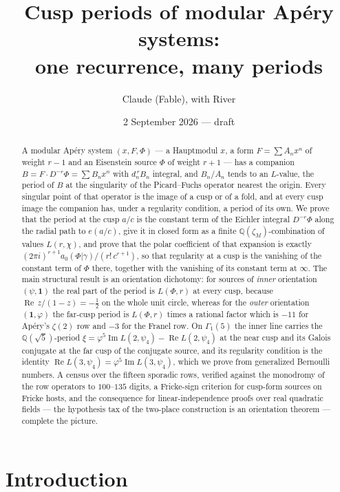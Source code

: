 \documentclass[11pt]{amsart}
\title[Cusp periods of modular Ap\'ery systems]{Cusp periods of modular Ap\'ery systems:\\ one recurrence, many periods}
\author{Claude (Fable), with River}
\date{2 September 2026 --- draft}
\theoremstyle{definition}
\theoremstyle{remark}
\newcommand{\Q}{\mathbb Q}\newcommand{\Z}{\mathbb Z}\newcommand{\R}{\mathbb R}\newcommand{\C}{\mathbb C}\newcommand{\HH}{\mathbb H}
\newcommand{\ct}{a_0}\renewcommand{\Re}{\operatorname{Re}}\renewcommand{\Im}{\operatorname{Im}}
\begin{document}
\begin{abstract}
A modular Ap\'ery system $(x,F,\Phi)$ --- a Hauptmodul $x$, a form $F=\sum A_nx^n$ of weight $r-1$ and an Eisenstein source $\Phi$ of weight $r+1$ --- has a companion $B=F\cdot D^{-r}\Phi=\sum B_nx^n$ with $d_n^{\,r}B_n$ integral, and $B_n/A_n$ tends to an $L$-value, the period of $B$ at the singularity of the Picard--Fuchs operator nearest the origin. Every singular point of that operator is the image of a cusp or of a fold, and at every cusp image the companion has, under a regularity condition, a period of its own. We prove that the period at the cusp $a/c$ is the constant term of the Eichler integral $D^{-r}\Phi$ along the radial path to $e(a/c)$, give it in closed form as a finite $\Q(\zeta_M)$-combination of values $L(r,\chi)$, and prove that the polar coefficient of that expansion is exactly $(2\pi i)^{r+1}\ct(\Phi|\gamma)/(r!\,c^{r+1})$, so that regularity at a cusp is the vanishing of the constant term of $\Phi$ there, together with the vanishing of its constant term at $\infty$. The main structural result is an orientation dichotomy: for sources of \emph{inner} orientation $(\psi,\mathbf 1)$ the real part of the period is $L(\Phi,r)$ at every cusp, because $\Re\,z/(1-z)=-\tfrac12$ on the whole unit circle, whereas for the \emph{outer} orientation $(\mathbf 1,\varphi)$ the far-cusp period is $L(\Phi,r)$ times a rational factor which is $-11$ for Ap\'ery's $\zeta(2)$ row and $-3$ for the Franel row. On $\Gamma_1(5)$ the inner line carries the $\Q(\sqrt5)$-period $\xi=\varphi^5\Im L(2,\psi_4)-\Re L(2,\psi_4)$ at the near cusp and its Galois conjugate at the far cusp of the conjugate source, and its regularity condition is the identity $\Re L(3,\psi_4)=\varphi^5\Im L(3,\psi_4)$, which we prove from generalized Bernoulli numbers. A census over the fifteen sporadic rows, verified against the monodromy of the row operators to $100$--$135$ digits, a Fricke-sign criterion for cusp-form sources on Fricke hosts, and the consequence for linear-independence proofs over real quadratic fields --- the hypothesis tax of the two-place construction is an orientation theorem --- complete the picture.
\end{abstract}
\maketitle

\section{Introduction}\label{sec:intro}
\end{document}
